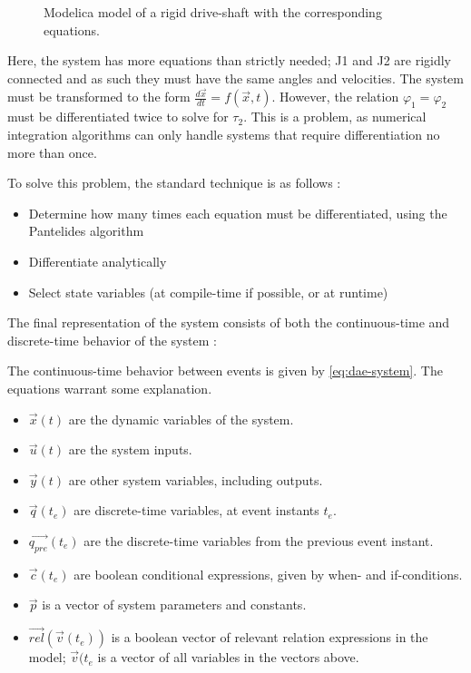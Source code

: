 \documentclass[\rootfolder/main.tex]{subfiles}
\begin{document}
\begin{figure}[ht]
	\begin{minipage}[c]{.75\columnwidth}
	\end{minipage}%
	\begin{minipage}[c]{.25\columnwidth}
	\end{minipage}
    \caption{Modelica model of a rigid drive-shaft with the corresponding equations.\label{fig:modelica-inertial-equations}}
\end{figure}

Here, the system has more equations than strictly needed;
J1 and J2 are rigidly connected and as such they must have the same angles and velocities.
The system must be transformed to the form $\frac{d\vec{x}}{dt} = f\left(\vec{x}, t\right)$.
However, the relation $\varphi_{1} = \varphi_{2}$ must be differentiated twice to solve for $\tau_{2}$.
This is a problem, as numerical integration algorithms can only handle systems that require differentiation no more than once.

To solve this problem, the standard technique is as follows \cite{clauss2002}:
\begin{itemize}
    \item Determine how many times each equation must be differentiated, using the Pantelides algorithm
    \item Differentiate analytically
    \item Select state variables (at compile-time if possible, or at runtime)
\end{itemize}

The final representation of the system consists of both the continuous-time and discrete-time behavior of the system \cite{openmodelica.org:lundvall:sims:2005}:


The continuous-time behavior between events is given by \cref{eq:dae-system}.
The equations warrant some explanation.

\begin{itemize}[noitemsep]
    \item $\vec{x}(t)$ are the dynamic variables of the system.
    \item $\vec{u}(t)$ are the system inputs.
    \item $\vec{y}(t)$ are other system variables, including outputs.
    \item $\vec{q}(t_{e})$ are discrete-time variables, at event instants $t_{e}$.
    \item $\vec{q_{pre}}(t_{e})$ are the discrete-time variables from the previous event instant.
    \item $\vec{c}(t_{e})$ are boolean conditional expressions, given by when- and if-conditions.
    \item $\vec{p}$ is a vector of system parameters and constants.
    \item $\vec{rel}(\vec{v}(t_{e}))$ is a boolean vector of relevant relation expressions in the model; $\vec{v}(t_{e}$ is a vector of all variables in the vectors above.
\end{itemize}
\end{document}
